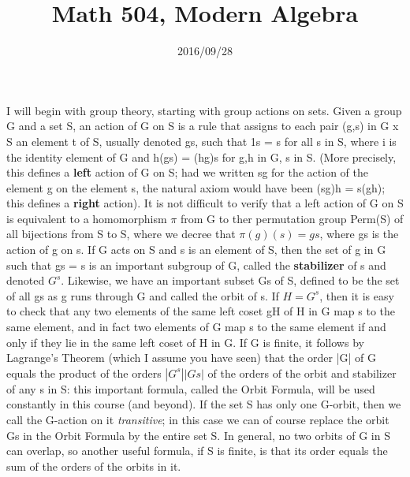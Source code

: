 \documentclass[10pt]{article}
\title{Math 504, Modern Algebra}
\date{2016/09/28}
\begin{document}
\maketitle

I will begin with group theory, starting with group actions on sets.
Given a group G and a set S, an action of G on S is a rule that assigns
to each pair (g,s) in G x S an element t of S, usually denoted gs, such
that 1s = s for all s in S, where i is the identity element of G and
h(gs) = (hg)s for g,h in G, s in S. (More precisely, this defines a
\textbf{left} action of G on S; had we written sg for the action of the
element g on the element s, the natural axiom would have been (sg)h =
s(gh); this defines a \textbf{right} action). It is not difficult to
verify that a left action of G on S is equivalent to a homomorphism
$\pi$ from G to ther permutation group Perm(S) of all bijections from S
to S, where we decree that $\pi(g)(s) = gs$, where gs is the action of g
on s. If G acts on S and s is an element of S, then the set of g in G
such that gs = s is an important subgroup of G, called the
\textbf{stabilizer} of s and denoted $G^s$. Likewise, we have an
important subset Gs of S, defined to be the set of all gs as g runs
through G and called the orbit of s. If $H = G^s$, then it is easy to
check that any two elements of the same left coset gH of H in G map s to
the same element, and in fact two elements of G map s to the same
element if and only if they lie in the same left coset of H in G. If G
is finite, it follows by Lagrange's Theorem (which I assume you have
seen) that the order |G| of G equals the product of the orders
$|G^s||Gs|$ of the orders of the orbit and stabilizer of any s in S:
this important formula, called the Orbit Formula, will be used
constantly in this course (and beyond). If the set S has only one
G-orbit, then we call the G-action on it {\sl transitive}; in this case
we can of course replace the orbit Gs in the Orbit Formula by the entire
set S. In general, no two orbits of G in S can overlap, so another
useful formula, if S is finite, is that its order equals the sum of the
orders of the orbits in it.
\end{document}
